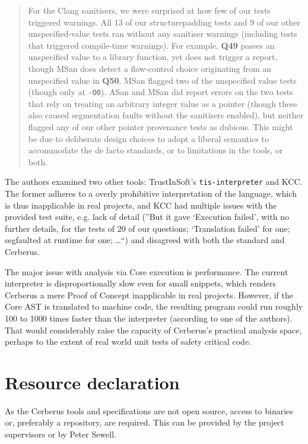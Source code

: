 \documentclass[12pt]{article}
\begin{document}
\begin{quote}
	For the Clang sanitisers, we were surprised at how few
	of our tests triggered warnings. All 13 of our structurepadding
	tests and 9 of our other unspecified-value tests ran
	without any sanitiser warnings (including tests that triggered
	compile-time warnings). For example, \textbf{Q49} passes an unspecified
	value to a library function, yet does not trigger a
	report, though MSan does detect a flow-control choice originating
	from an unspecified value in \textbf{Q50}. MSan flagged two
	of the unspecified value tests (though only at \texttt{-O0}). ASan and
	MSan did report errors on the two tests that rely on treating
	an arbitrary integer value as a pointer (though these also
	caused segmentation faults without the sanitisers enabled),
	but neither flagged any of our other pointer provenance tests
	as dubious. This might be due to deliberate design choices to
	adopt a liberal semantics to accommodate the de facto standards,
	or to limitations in the tools, or both.
\end{quote}

The authors examined two other tools: TrustInSoft's \texttt{tis-interpreter} and KCC. The former adheres to a overly prohibitive interpretation of the language, which is thus inapplicable in real projects, and KCC had multiple issues with the provided test suite, e.g. lack of detail (''But it gave ‘Execution failed’, with no
further details, for the tests of 20 of our questions; ‘Translation
failed’ for one; segfaulted at runtime for one; \dots ``) and disagreed with both the standard and Cerberus. 

The major issue with analysis via Core execution is performance. The current interpreter is disproportionally slow even for small snippets, which renders Cerberus a mere Proof of Concept inapplicable in real projects. However, if the Core AST is translated to machine code, the resulting program could run roughly 100 to 1000 times faster than the interpreter (according to one of the authors). That would considerably raise the capacity of Cerberus's practical analysis space, perhaps to the extent of real world unit tests of safety critical code.

\section{Resource declaration}	
As the Cerberus tools and specifications are not open source, access to binaries or, preferably a repository, are required. This can be provided by the project supervisors or by Peter Sewell. 
\end{document}
